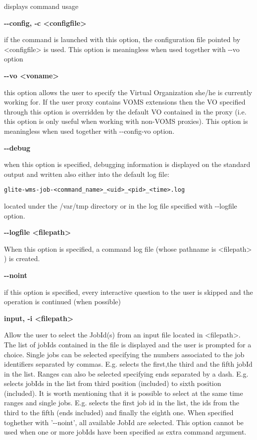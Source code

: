 displays command usage




\textbf{-{}-config, -c <configfile>}

if the command is launched with this option, the configuration file pointed by <configfile> is used. This option is meaningless when used together with -{}-vo option




\textbf{-{}-vo <voname>}

this option allows the user to specify the Virtual Organization she/he is currently working for.
If the user proxy contains VOMS extensions then the VO specified through this option is overridden by the
default VO contained in the proxy (i.e. this option is only useful when working with non-VOMS proxies).
This option is meaningless when used together with -{}-config-vo option.




\textbf{-{}-debug}

when this option is specified, debugging information is displayed on the standard output and written also either into the default log file:


\begin{verbatim}
glite-wms-job-<command_name>_<uid>_<pid>_<time>.log
\end{verbatim}

located under the /var/tmp  directory or in the log file specified with -{}-logfile option.




\textbf{-{}-logfile <filepath>}

When this option is specified, a command log file (whose pathname is <filepath> ) is created.



\textbf{-{}-noint  }

if this option is specified, every interactive question to the user is skipped and the operation is continued (when possible)





\textbf{input, -i <filepath>}

Allow the user to select the JobId(s) from an input file located in <filepath>.
The list of jobIds contained in the file is displayed and the user is prompted for a choice. 
Single jobs can be selected specifying the numbers associated to the job identifiers separated by 
commas. E.g. selects the first,the third and the fifth jobId in the list.
Ranges can also be selected specifying ends separated by a dash. E.g. selects jobIds in the list 
from third position (included) to sixth position (included). It is worth mentioning that it is 
possible to select at the same time ranges and single jobs. E.g. selects the first job id in the list, 
the ids from the third to the fifth (ends included) and finally the eighth one.
When specified toghether with '-{}-noint', all available JobId are selected.
 This option cannot be used when one or more jobIds have been specified as extra command argument.





